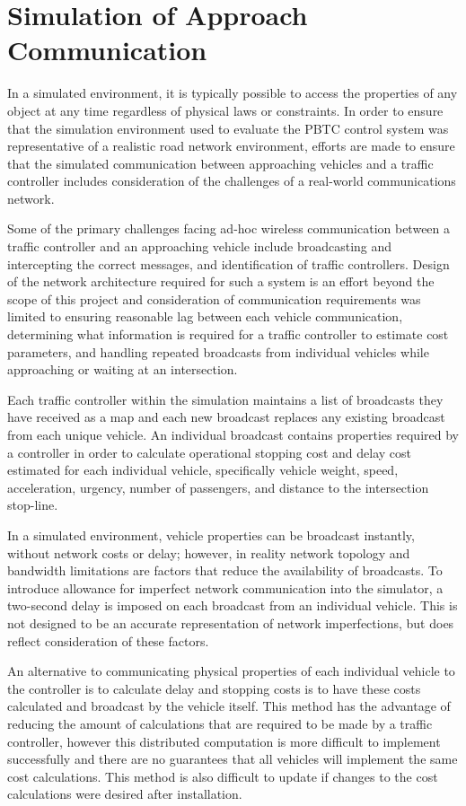 \section{Simulation of Approach Communication}

In a simulated environment, it is typically possible to access the properties of any object at any time regardless of physical laws or constraints. In order to ensure that the simulation environment used to evaluate the PBTC control system was representative of a realistic road network environment, efforts are made to ensure that the simulated communication between approaching vehicles and a traffic controller includes consideration of the challenges of a real-world communications network. 

Some of the primary challenges facing ad-hoc wireless communication between a traffic controller and an approaching vehicle include broadcasting and intercepting the correct messages, and identification of traffic controllers. Design of the network architecture required for such a system is an effort beyond the scope of this project and consideration of communication requirements was limited to ensuring reasonable lag between each vehicle communication, determining what information is required for a traffic controller to estimate cost parameters, and handling repeated broadcasts from individual vehicles while approaching or waiting at an intersection.

Each traffic controller within the simulation maintains a list of broadcasts they have received as a map and each new broadcast replaces any existing broadcast from each unique vehicle. An individual broadcast contains properties required by a controller in order to calculate operational stopping cost and delay cost estimated for each individual vehicle, specifically vehicle weight, speed, acceleration, urgency, number of passengers, and distance to the intersection stop-line. 

In a simulated environment, vehicle properties can be broadcast instantly, without network costs or delay; however, in reality network topology and bandwidth limitations are factors that reduce the availability of broadcasts. To introduce allowance for imperfect network communication into the simulator, a two-second delay is imposed on each broadcast from an individual vehicle. This is not designed to be an accurate representation of network imperfections, but does reflect consideration of these factors.
 
An alternative to communicating physical properties of each individual vehicle to the controller is to calculate delay and stopping costs is to have these costs calculated and broadcast by the vehicle itself. This method has the advantage of reducing the amount of calculations that are required to be made by a traffic controller, however this distributed computation is more difficult to implement successfully and there are no guarantees that all vehicles will implement the same cost calculations. This method is also difficult to update if changes to the cost calculations were desired after installation.

